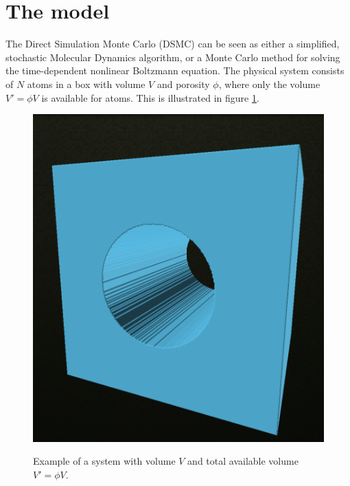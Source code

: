 \section{The model}
\label{sec:dsmc_model}
The Direct Simulation Monte Carlo (DSMC) can be seen as either a simplified, stochastic Molecular Dynamics algorithm, or a Monte Carlo method for solving the time-dependent nonlinear Boltzmann equation. The physical system consists of $N$ atoms in a box with volume $V$ and porosity $\phi$, where only the volume $V' = \phi V$ is available for atoms. This is illustrated in figure \ref{fig:cylinder}.
\begin{figure}[h]
\begin{center}
\includegraphics[width=\textwidth, trim=0cm 0cm 0cm 0cm, clip]{DSMC/figures/cylinder.png}
\label{fig:cylinder}
\end{center}
\caption{Example of a system with volume $V$ and total available volume $V' = \phi V$.}
\end{figure}
